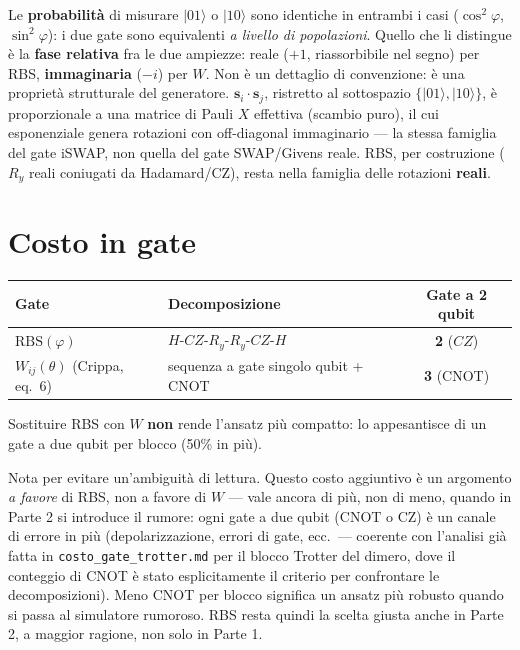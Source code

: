 \documentclass[11pt,a4paper]{article}
\begin{document}
Le \textbf{probabilità} di misurare $|01\rangle$ o $|10\rangle$ sono
identiche in entrambi i casi ($\cos^2\varphi$, $\sin^2\varphi$): i due
gate sono equivalenti \emph{a livello di popolazioni}. Quello che li
distingue è la \textbf{fase relativa} fra le due ampiezze: reale ($+1$,
riassorbibile nel segno) per RBS, \textbf{immaginaria} ($-i$) per $W$.
Non è un dettaglio di convenzione: è una proprietà strutturale del
generatore. $\mathbf s_i\cdot\mathbf s_j$, ristretto al sottospazio
$\{|01\rangle,|10\rangle\}$, è proporzionale a una matrice di Pauli $X$
effettiva (scambio puro), il cui esponenziale genera rotazioni con
off-diagonal immaginario --- la stessa famiglia del gate iSWAP, non
quella del gate SWAP/Givens reale. RBS, per costruzione ($R_y$ reali
coniugati da Hadamard/CZ), resta nella famiglia delle rotazioni
\textbf{reali}.

\section{Costo in gate}

\begin{center}
\renewcommand{\arraystretch}{1.3}
\begin{tabular}{@{}lp{5.2cm}c@{}}
\toprule
\rowcolor{inkblue!10}
\textbf{Gate} & \textbf{Decomposizione} & \textbf{Gate a 2 qubit}\\
\midrule
$\mathrm{RBS}(\varphi)$ & $H\text{-}CZ\text{-}R_y\text{-}R_y\text{-}CZ\text{-}H$ & \textbf{2} ($CZ$)\\
$W_{ij}(\theta)$ (Crippa, eq.\ 6) & sequenza a gate singolo qubit + CNOT & \textbf{3} (CNOT)\\
\bottomrule
\end{tabular}
\end{center}

Sostituire RBS con $W$ \textbf{non} rende l'ansatz più compatto: lo
appesantisce di un gate a due qubit per blocco (50\% in più).

\begin{editnote}
Nota per evitare un'ambiguità di lettura. Questo costo aggiuntivo è un
argomento \emph{a favore} di RBS, non a favore di $W$ --- vale ancora
di più, non di meno, quando in Parte 2 si introduce il rumore: ogni
gate a due qubit (CNOT o CZ) è un canale di errore in più
(depolarizzazione, errori di gate, ecc.\ --- coerente con l'analisi già
fatta in \texttt{costo\_gate\_trotter.md} per il blocco Trotter del
dimero, dove il conteggio di CNOT è stato esplicitamente il criterio
per confrontare le decomposizioni). Meno CNOT per blocco significa un
ansatz più robusto quando si passa al simulatore rumoroso. RBS resta
quindi la scelta giusta anche in Parte 2, a maggior ragione, non solo
in Parte 1.
\end{editnote}
\end{document}
